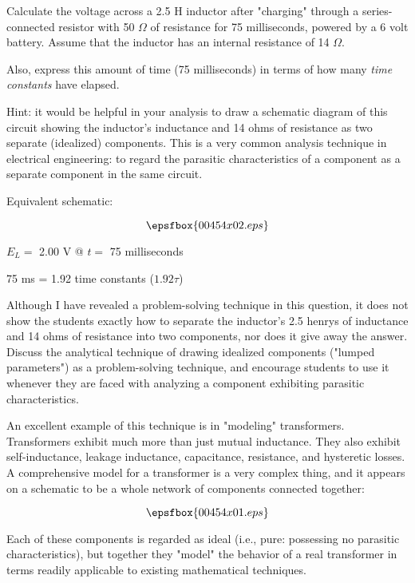 

Calculate the voltage across a 2.5 H inductor after "charging" through a series-connected resistor with 50 $\Omega$ of resistance for 75 milliseconds, powered by a 6 volt battery.  Assume that the inductor has an internal resistance of 14 $\Omega$.

Also, express this amount of time (75 milliseconds) in terms of how many {\it time constants} have elapsed.

\vskip 10pt

Hint: it would be helpful in your analysis to draw a schematic diagram of this circuit showing the inductor's inductance and 14 ohms of resistance as two separate (idealized) components.  This is a very common analysis technique in electrical engineering: to regard the parasitic characteristics of a component as a separate component in the same circuit.







Equivalent schematic:

$$\epsfbox{00454x02.eps}$$

$E_L =$ 2.00 V @ $t =$ 75 milliseconds

75 ms = 1.92 time constants ($1.92\tau$)







Although I have revealed a problem-solving technique in this question, it does not show the students exactly how to separate the inductor's 2.5 henrys of inductance and 14 ohms of resistance into two components, nor does it give away the answer.  Discuss the analytical technique of drawing idealized components ("lumped parameters") as a problem-solving technique, and encourage students to use it whenever they are faced with analyzing a component exhibiting parasitic characteristics.

An excellent example of this technique is in "modeling" transformers.  Transformers exhibit much more than just mutual inductance.  They also exhibit self-inductance, leakage inductance, capacitance, resistance, and hysteretic losses.  A comprehensive model for a transformer is a very complex thing, and it appears on a schematic to be a whole network of components connected together:

$$\epsfbox{00454x01.eps}$$

Each of these components is regarded as ideal (i.e., pure: possessing no parasitic characteristics), but together they "model" the behavior of a real transformer in terms readily applicable to existing mathematical techniques.





